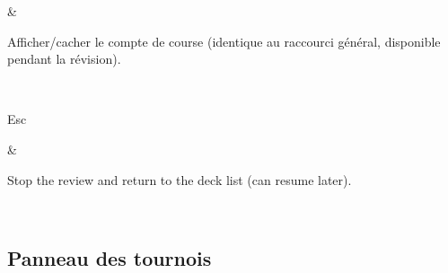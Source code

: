\documentclass[letterpaper,10pt,english]{sphinxmanual}
\begin{document}
\begin{savenotes}
\begin{tabular}[t]{}
\begin{varwidth}[t]{}
\end{varwidth}%
&\begin{varwidth}[t]{}
\sphinxAtStartPar
Afficher/cacher le compte de course (identique au raccourci général, disponible pendant la révision).
\sphinxbeforeendvarwidth
\end{varwidth}%
\\
\sphinxhline\begin{varwidth}[t]{}
\sphinxAtStartPar
Esc
\sphinxbeforeendvarwidth
\end{varwidth}%
&\begin{varwidth}[t]{}
\sphinxAtStartPar
Stop the review and return to the deck list (can resume later).
\sphinxbeforeendvarwidth
\end{varwidth}%
\\
\sphinxbottomrule
\end{tabular}
\sphinxtableafterendhook\par
\sphinxattableend\end{savenotes}


\subsection{Panneau des tournois}
\label{\detokenize{raccourcis:panneau-des-tournois}}\label{\detokenize{raccourcis:raccourcis-tournament-panel}}
\end{document}
